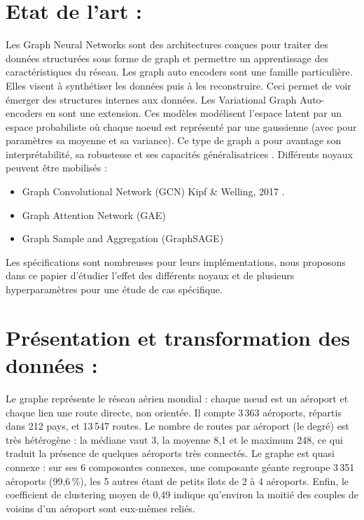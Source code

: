 \documentclass[french]{llncs}
\begin{document}
 \section{Etat de l'art : } 
Les Graph Neural Networks sont des architectures conçues pour traiter des données structurées sous forme de graph et permettre un apprentissage des caractéristiques du réseau. 
Les graph auto encoders sont une famille particulière. Elles visent à synthétiser les données puis à les reconstruire. Ceci permet de voir émerger des structures internes aux données. Les Variational Graph Auto-encoders \cite{article} en sont une extension. Ces modèles modélisent l'espace latent par un espace probabiliste où chaque noeud est représenté par une gaussienne (avec pour paramètres sa moyenne et sa variance).
Ce type de graph a pour avantage son interprétabilité, sa robustesse et ses capacités généralisatrices \cite{yang2024variationalgraphautoencoderbased}. 
Différents noyaux peuvent être mobilisés : 
\begin{itemize}
    \item Graph Convolutional Network (GCN) Kipf \& Welling, 2017 \cite{DBLP:journals/corr/KipfW16}. 
    \item Graph Attention Network (GAE) \cite{kipf2016variationalgraphautoencoders}
    \item Graph Sample and Aggregation (GraphSAGE) \cite{DBLP:journals/corr/HamiltonYL17}
\end{itemize}
Les spécifications sont nombreuses pour leurs implémentations, nous proposons dans ce papier d'étudier l'effet des différents noyaux et de plusieurs hyperparamètres pour une étude de cas spécifique. 

 \section{Présentation et transformation des données :  }
 
Le graphe représente le réseau aérien mondial : chaque nœud est un aéroport et chaque lien une route directe, non orientée. Il compte 3\,363 aéroports, répartis dans 212 pays, et 13\,547 routes. Le nombre de routes par aéroport (le degré) est très hétérogène : la médiane vaut 3, la moyenne 8,1 et le maximum 248, ce qui traduit la présence de quelques aéroports très connectés. Le graphe est quasi connexe : sur ses 6 composantes connexes, une composante géante regroupe 3\,351 aéroports (99,6\,\%), les 5 autres étant de petits îlots de 2 à 4 aéroports. Enfin, le coefficient de clustering moyen de 0,49 indique qu'environ la moitié des couples de voisins d'un aéroport sont eux-mêmes reliés.
\end{document}
